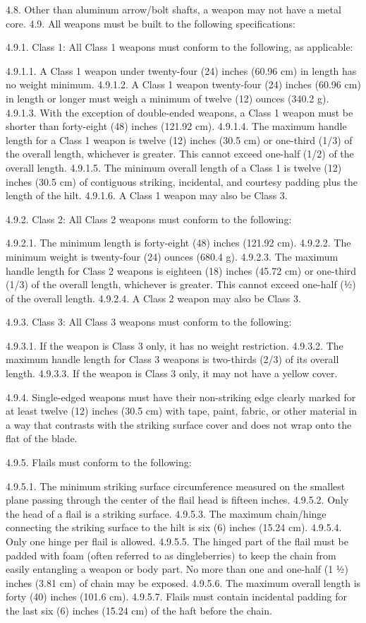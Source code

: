 \documentclass[12pt]{article}
\begin{document}
\begin{level}[start=0]
4.8. Other than aluminum arrow/bolt shafts, a weapon may not have a metal core.
4.9. All weapons must be built to the following specifications:

4.9.1. Class 1: All Class 1 weapons must conform to the following, as applicable:

4.9.1.1. A Class 1 weapon under twenty-four (24) inches (60.96 cm) in length has no weight minimum.
4.9.1.2. A Class 1 weapon twenty-four (24) inches (60.96 cm) in length or longer must weigh a minimum of twelve (12) ounces (340.2 g).
4.9.1.3. With the exception of double-ended weapons, a Class 1 weapon must be shorter than forty-eight (48) inches (121.92 cm).
4.9.1.4. The maximum handle length for a Class 1 weapon is twelve (12) inches (30.5 cm) or one-third (1/3) of the overall length, whichever is greater. This cannot exceed one-half (1/2) of the overall length.
4.9.1.5. The minimum overall length of a Class 1 is twelve (12) inches (30.5 cm) of contiguous striking, incidental, and courtesy padding plus the length of the hilt.
4.9.1.6. A Class 1 weapon may also be Class 3.

4.9.2. Class 2: All Class 2 weapons must conform to the following:

4.9.2.1. The minimum length is forty-eight (48) inches (121.92 cm).
4.9.2.2. The minimum weight is twenty-four (24) ounces (680.4 g).
4.9.2.3. The maximum handle length for Class 2 weapons is eighteen (18) inches (45.72 cm) or one-third (1/3) of the overall length, whichever is greater. This cannot exceed one-half (½) of the overall length.
4.9.2.4. A Class 2 weapon may also be Class 3.

4.9.3. Class 3: All Class 3 weapons must conform to the following:

4.9.3.1. If the weapon is Class 3 only, it has no weight restriction.
4.9.3.2. The maximum handle length for Class 3 weapons is two-thirds (2/3) of its overall length.
4.9.3.3. If the weapon is Class 3 only, it may not have a yellow cover.

4.9.4. Single-edged weapons must have their non-striking edge clearly marked for at least twelve (12) inches (30.5 cm) with tape, paint, fabric, or other material in a way that contrasts with the striking surface cover and does not wrap onto the flat of the blade.


4.9.5. Flails must conform to the following:

4.9.5.1. The minimum striking surface circumference measured on the smallest plane passing through the center of the flail head is fifteen inches.
4.9.5.2. Only the head of a flail is a striking surface.
4.9.5.3. The maximum chain/hinge connecting the striking surface to the hilt is six (6) inches (15.24 cm).
4.9.5.4. Only one hinge per flail is allowed.
4.9.5.5. The hinged part of the flail must be padded with foam (often referred to as dingleberries) to keep the chain from easily entangling a weapon or body part. No more than one and one-half (1 ½) inches  (3.81 cm) of chain may be exposed.
4.9.5.6. The maximum overall length is forty (40) inches (101.6 cm).
4.9.5.7. Flails must contain incidental padding for the last six (6) inches (15.24 cm) of the haft before the chain.


\end{level}
\end{document}
